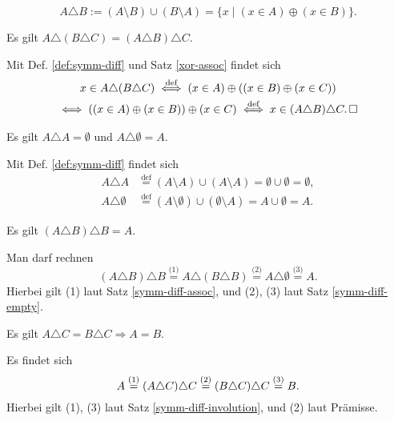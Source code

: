 \begin{Definition}\label{def:symm-diff}\newlinefirst
\[A\triangle B := (A\setminus B)\cup (B\setminus A) = \{x\mid (x\in A)\oplus (x\in B)\}.\]
\end{Definition}
\begin{Satz}\label{symm-diff-assoc}\strong{[LEM]}
Es gilt $A\triangle (B\triangle C) = (A\triangle B)\triangle C$.
\end{Satz}
\begin{Beweis}
Mit Def. \ref{def:symm-diff} und Satz \ref{xor-assoc} findet sich
\begin{gather*}
x\in A\triangle (B\triangle C) \stackrel{\text{def}}\iff (x\in A)\oplus ((x\in B)\oplus (x\in C))\\
\iff ((x\in A)\oplus (x\in B))\oplus (x\in C)
\stackrel{\text{def}}\iff x\in (A\triangle B)\triangle C.\,\square
\end{gather*}
\end{Beweis}

\newpage
\begin{Satz}\label{symm-diff-empty}
Es gilt $A\triangle A = \emptyset$ und $A\triangle\emptyset = A$.
\end{Satz}
\begin{Beweis}
Mit Def. \ref{def:symm-diff} findet sich
\begin{align*}
A\triangle A &\stackrel{\text{def}}= (A\setminus A)\cup (A\setminus A)
= \emptyset\cup\emptyset = \emptyset,\\
A\triangle\emptyset &\stackrel{\text{def}}=
(A\setminus\emptyset)\cup (\emptyset\setminus A)
= A\cup\emptyset = A.
\end{align*}
\end{Beweis}

\begin{Satz}\strong{[LEM]}\label{symm-diff-involution}
Es gilt $(A\triangle B)\triangle B = A$.
\end{Satz}
\begin{Beweis}
Man darf rechnen
\[(A\triangle B)\triangle B \stackrel{\text{(1)}}= A\triangle (B\triangle B)
\stackrel{\text{(2)}}= A\triangle\emptyset \stackrel{\text{(3)}}= A.\]
Hierbei gilt (1) laut Satz \ref{symm-diff-assoc}, und (2), (3) laut
Satz \ref{symm-diff-empty}.\,\qedsymbol
\end{Beweis}

\begin{Satz}\strong{[LEM]}
Es gilt $A\triangle C = B\triangle C\Rightarrow A = B$.
\end{Satz}
\begin{Beweis}
Es findet sich
\[A \stackrel{\text(1)}= (A\triangle C)\triangle C
\stackrel{\text{(2)}}= (B\triangle C)\triangle C
\stackrel{\text{(3)}}= B.\]
Hierbei gilt (1), (3) laut Satz \ref{symm-diff-involution},
und (2) laut Prämisse.\,\qedsymbol
\end{Beweis}

